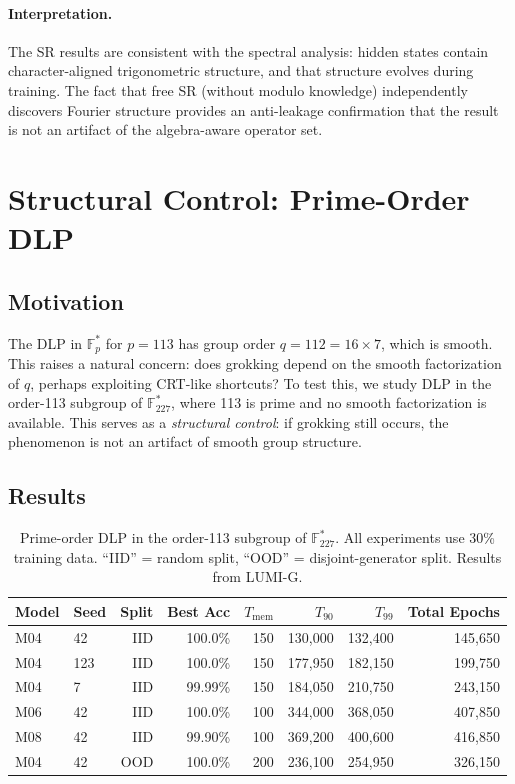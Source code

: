 \documentclass[twoside,11pt]{article}
\newcommand{\Fps}{\mathbb{F}_p^*}
\newcommand{\Tmem}{T_{\mathrm{mem}}}
\newcommand{\Tninety}{T_{90}}
\newcommand{\Tnine}{T_{99}}
\begin{document}
\paragraph{Interpretation.}
The SR results are consistent with the spectral analysis: hidden states contain character-aligned trigonometric structure, and that structure evolves during training. The fact that free SR (without modulo knowledge) independently discovers Fourier structure provides an anti-leakage confirmation that the result is not an artifact of the algebra-aware operator set.



\section{Structural Control: Prime-Order DLP}
\label{sec:prime_order}

\subsection{Motivation}

The DLP in $\Fps$ for $p = 113$ has group order $q = 112 = 16 \times 7$, which is smooth. This raises a natural concern: does grokking depend on the smooth factorization of $q$, perhaps exploiting CRT-like shortcuts? To test this, we study DLP in the order-113 subgroup of $\mathbb{F}_{227}^*$, where 113 is prime and no smooth factorization is available. This serves as a \emph{structural control}: if grokking still occurs, the phenomenon is not an artifact of smooth group structure.

\subsection{Results}

\begin{table}[H]
\centering
\caption{Prime-order DLP in the order-113 subgroup of $\mathbb{F}_{227}^*$. All experiments use 30\% training data. ``IID'' = random split, ``OOD'' = disjoint-generator split. Results from LUMI-G.}
\label{tab:prime_order_results}
\begin{tabular}{llrrrrrr}
\toprule
Model & Seed & Split & Best Acc & $\Tmem$ & $\Tninety$ & $\Tnine$ & Total Epochs \\
\midrule
M04 & 42 & IID & 100.0\% & 150 & 130,000 & 132,400 & 145,650 \\
M04 & 123 & IID & 100.0\% & 150 & 177,950 & 182,150 & 199,750 \\
M04 & 7 & IID & 99.99\% & 150 & 184,050 & 210,750 & 243,150 \\
M06 & 42 & IID & 100.0\% & 100 & 344,000 & 368,050 & 407,850 \\
M08 & 42 & IID & 99.90\% & 100 & 369,200 & 400,600 & 416,850 \\
M04 & 42 & OOD & 100.0\% & 200 & 236,100 & 254,950 & 326,150 \\
\bottomrule
\end{tabular}
\end{table}
\end{document}

